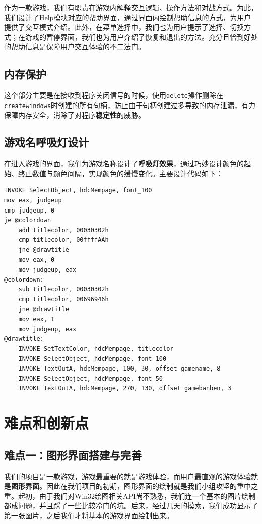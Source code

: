 \documentclass[lang=cn,11pt,a4paper]{elegantpaper}
\begin{document}
作为一款游戏，我们有职责在游戏内解释交互逻辑、操作方法和对战方式。为此，我们设计了Help模块对应的帮助界面，通过界面内绘制帮助信息的方式，为用户提供了交互模式介绍。此外，在菜单选择中，我们也为用户提示了选择、切换方式；在游戏的暂停界面，我们也为用户介绍了恢复和退出的方法。充分且恰到好处的帮助信息是保障用户交互体验的不二法门。

\subsection{内存保护}

这个部分主要是在接收到程序关闭信号的时候，使用\verb|delete|操作删除在\verb|createwindows|时创建的所有句柄，防止由于句柄创建过多导致的内存泄漏，有力保障内存安全，消除了对程序\textbf{稳定性}的威胁。

\subsection{游戏名呼吸灯设计}

在进入游戏的界面，我们为游戏名称设计了\textbf{呼吸灯效果}，通过巧妙设计颜色的起始、终止数值与颜色间隔，实现颜色的缓慢变化。主要设计代码如下：

\begin{lstlisting}[title=代码2：游戏名呼吸灯]
INVOKE SelectObject, hdcMempage, font_100
mov eax, judgeup
cmp judgeup, 0
je @colordown
	add titlecolor, 00030302h
	cmp titlecolor, 00ffffAAh
	jne @drawtitle
	mov eax, 0
	mov judgeup, eax
@colordown:
	sub titlecolor, 00030302h
	cmp titlecolor, 00696946h
	jne @drawtitle
	mov eax, 1
	mov judgeup, eax
@drawtitle:
	INVOKE SetTextColor, hdcMempage, titlecolor
	INVOKE SelectObject, hdcMempage, font_100
	INVOKE TextOutA, hdcMempage, 100, 30, offset gamename, 8
	INVOKE SelectObject, hdcMempage, font_50
	INVOKE TextOutA, hdcMempage, 270, 130, offset gamebanben, 3
\end{lstlisting}

\section{难点和创新点}

\subsection{难点一：图形界面搭建与完善}

我们的项目是一款游戏，游戏最重要的就是游戏体验，而用户最直观的游戏体验就是\textbf{图形界面}。因此在我们项目的初期，图形界面的绘制就是我们小组攻坚的重中之重。起初，由于我们对Win32绘图相关API尚不熟悉，我们连一个基本的图片绘制都成问题，并且踩了一些比较冷门的坑。后来，经过几天的摸索，我们成功显示了第一张图片，之后我们才将基本的游戏界面绘制出来。
\end{document}
